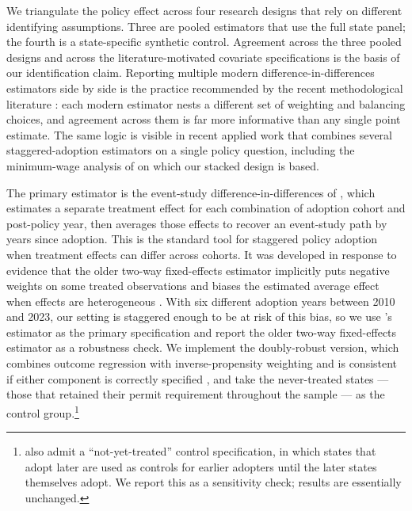 \documentclass[12pt]{article}
\begin{document}
We triangulate the policy effect across four research designs that
rely on different identifying assumptions. Three are pooled
estimators that use the full state panel; the fourth is a
state-specific synthetic control. Agreement across the three pooled
designs and across the literature-motivated covariate
specifications is the basis of our identification claim. Reporting
multiple modern difference-in-differences estimators side by side
is the practice recommended by the recent methodological literature
\citep{rothsantanna2023, goodmanbacon2021, sunabraham2021,
dechaisemartin2020}: each modern estimator nests a different set of
weighting and balancing choices, and agreement across them is far
more informative than any single point estimate. The same logic is
visible in recent applied work that combines several
staggered-adoption estimators on a single policy question,
including the minimum-wage analysis of \citet{cengiz2019} on which
our stacked design is based.

The primary estimator is the event-study difference-in-differences
of \citet{callaway2021}, which estimates a separate treatment
effect for each combination of adoption cohort and post-policy
year, then averages those effects to recover an event-study path
by years since adoption. This is the standard tool for staggered
policy adoption when treatment effects can differ across cohorts.
It was developed in response to evidence that the older two-way
fixed-effects estimator implicitly puts negative weights on some
treated observations and biases the estimated average effect when
effects are heterogeneous \citep{goodmanbacon2021,
dechaisemartin2020, sunabraham2021}. With six different adoption
years between 2010 and 2023, our setting is staggered enough to be
at risk of this bias, so we use \citeauthor{callaway2021}'s
estimator as the primary specification and report the older
two-way fixed-effects estimator as a robustness check. We
implement the doubly-robust version, which combines outcome
regression with inverse-propensity weighting and is consistent if
either component is correctly specified \citep{santanna2020}, and
take the never-treated states --- those that retained their permit
requirement throughout the sample --- as the control
group.\footnote{\citet{callaway2021} also admit a
``not-yet-treated'' control specification, in which states that
adopt later are used as controls for earlier adopters until the
later states themselves adopt. We report this as a sensitivity
check; results are essentially unchanged.}
\end{document}
